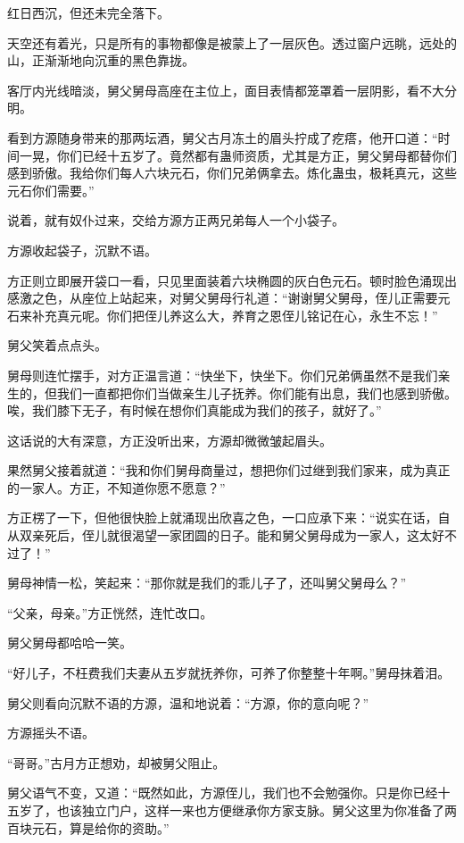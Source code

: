 
\begin{this_body}

红日西沉，但还未完全落下。

天空还有着光，只是所有的事物都像是被蒙上了一层灰色。透过窗户远眺，远处的山，正渐渐地向沉重的黑色靠拢。

客厅内光线暗淡，舅父舅母高座在主位上，面目表情都笼罩着一层阴影，看不大分明。

看到方源随身带来的那两坛酒，舅父古月冻土的眉头拧成了疙瘩，他开口道：“时间一晃，你们已经十五岁了。竟然都有蛊师资质，尤其是方正，舅父舅母都替你们感到骄傲。我给你们每人六块元石，你们兄弟俩拿去。炼化蛊虫，极耗真元，这些元石你们需要。”

说着，就有奴仆过来，交给方源方正两兄弟每人一个小袋子。

方源收起袋子，沉默不语。

方正则立即展开袋口一看，只见里面装着六块椭圆的灰白色元石。顿时脸色涌现出感激之色，从座位上站起来，对舅父舅母行礼道：“谢谢舅父舅母，侄儿正需要元石来补充真元呢。你们把侄儿养这么大，养育之恩侄儿铭记在心，永生不忘！”

舅父笑着点点头。

舅母则连忙摆手，对方正温言道：“快坐下，快坐下。你们兄弟俩虽然不是我们亲生的，但我们一直都把你们当做亲生儿子抚养。你们能有出息，我们也感到骄傲。唉，我们膝下无子，有时候在想你们真能成为我们的孩子，就好了。”

这话说的大有深意，方正没听出来，方源却微微皱起眉头。

果然舅父接着就道：“我和你们舅母商量过，想把你们过继到我们家来，成为真正的一家人。方正，不知道你愿不愿意？”

方正楞了一下，但他很快脸上就涌现出欣喜之色，一口应承下来：“说实在话，自从双亲死后，侄儿就很渴望一家团圆的日子。能和舅父舅母成为一家人，这太好不过了！”

舅母神情一松，笑起来：“那你就是我们的乖儿子了，还叫舅父舅母么？”

“父亲，母亲。”方正恍然，连忙改口。

舅父舅母都哈哈一笑。

“好儿子，不枉费我们夫妻从五岁就抚养你，可养了你整整十年啊。”舅母抹着泪。

舅父则看向沉默不语的方源，温和地说着：“方源，你的意向呢？”

方源摇头不语。

“哥哥。”古月方正想劝，却被舅父阻止。

舅父语气不变，又道：“既然如此，方源侄儿，我们也不会勉强你。只是你已经十五岁了，也该独立门户，这样一来也方便继承你方家支脉。舅父这里为你准备了两百块元石，算是给你的资助。”


\end{this_body}
